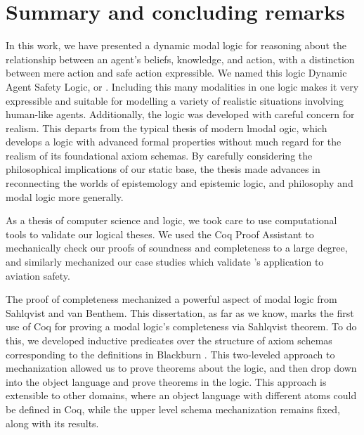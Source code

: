 \newenvironment{proofenum}{%
	\begin{enumerate}
		\renewcommand\labelenumi{(\arabic{section}.\arabic{enumi})}}
	{\end{enumerate}}

\chapter{Summary and concluding remarks}
	\label{CH_summary}

In this work, we have presented a dynamic modal logic for reasoning about the relationship between an agent's beliefs, knowledge, and action, with a distinction between mere action and safe action expressible. We named this logic Dynamic Agent Safety Logic, or \DASL. Including this many modalities in one logic makes it very expressible and suitable for modelling a variety of realistic situations involving human-like agents. Additionally, the logic was developed with careful concern for realism. This departs from the typical thesis of modern lmodal ogic, which develops a logic with advanced formal properties without much regard for the realism of its foundational axiom schemas. By carefully considering the philosophical implications of our static base, the thesis made advances in reconnecting the worlds of epistemology and epistemic logic, and philosophy and modal logic more generally.

As a thesis of computer science and logic, we took care to use computational tools to validate our logical theses. We used the Coq Proof Assistant to mechanically check our proofs of soundness and completeness to a large degree, and similarly mechanized our case studies which validate \DASL's application to aviation safety. 

The proof of completeness mechanized a powerful aspect of modal logic from Sahlqvist and van Benthem. This dissertation, as far as we know, marks the first use of Coq for proving a modal logic's completeness via Sahlqvist theorem. To do this, we developed inductive predicates over the structure of axiom schemas corresponding to the definitions in Blackburn \etal\cite{modal}. This two-leveled approach to mechanization allowed us to prove theorems about the logic, and then drop down into the object language and prove theorems in the logic. This approach is extensible to other domains, where an object language with different atoms could be defined in Coq, while the upper level schema mechanization remains fixed, along with its results.

